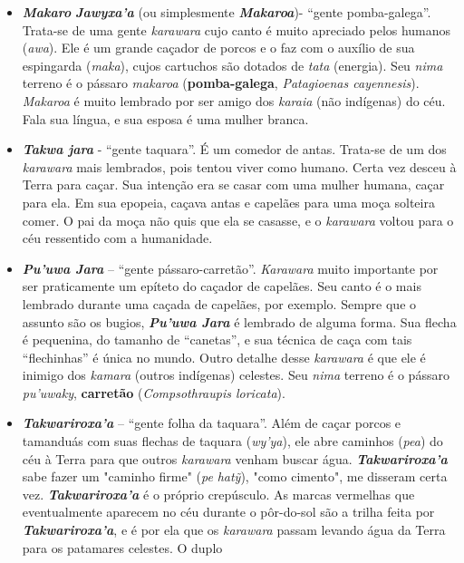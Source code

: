\begin{itemize}
\item
  \emph{\textbf{Makaro}} \emph{\textbf{Jawyxa'a}} (ou simplesmente
  \emph{\textbf{Makaroa}})- ``gente pomba-galega''. Trata-se de uma
  gente \emph{karawara} cujo canto é muito apreciado pelos humanos
  (\emph{awa}). Ele é um grande caçador de porcos e o faz com o auxílio
  de sua espingarda (\emph{maka}), cujos cartuchos são dotados de
  \emph{tata} (energia). Seu \emph{nima} terreno é o pássaro
  \emph{makaroa} (\textbf{pomba-galega}, \emph{Patagioenas cayennesis}).
  \emph{Makaroa} é muito lembrado por ser amigo dos \emph{karaia} (não
  indígenas) do céu. Fala sua língua, e sua esposa é uma mulher branca.
\item
  \emph{\textbf{Takwa jara}} - ``gente taquara''. É um comedor de antas.
  Trata-se de um dos \emph{karawara} mais lembrados, pois tentou viver
  como humano. Certa vez desceu à Terra para caçar. Sua intenção era se
  casar com uma mulher humana, caçar para ela. Em sua epopeia, caçava
  antas e capelães para uma moça solteira comer. O pai da moça não quis
  que ela se casasse, e o \emph{karawara} voltou para o céu ressentido
  com a humanidade.
\item
  \emph{\textbf{Pu'uwa Jara}} -- ``gente pássaro-carretão''.
  \emph{Karawara} muito importante por ser praticamente um epíteto do
  caçador de capelães. Seu canto é o mais lembrado durante uma caçada de
  capelães, por exemplo. Sempre que o assunto são os bugios,
  \textbf{\emph{Pu'uwa Jara}} é lembrado de alguma forma. Sua flecha é
  pequenina, do tamanho de ``canetas'', e sua técnica de caça com tais
  ``flechinhas'' é única no mundo. Outro detalhe desse \emph{karawara} é
  que ele é inimigo dos \emph{kamara} (outros indígenas) celestes. Seu
  \emph{nima} terreno é o pássaro \emph{pu'uwaky}, \textbf{carretão}
  (\emph{Compsothraupis loricata}).
\item
  \emph{\textbf{Takwariroxa'a}} -- ``gente folha da taquara''. Além de
  caçar porcos e tamanduás com suas flechas de taquara (\emph{wy'ya}),
  ele abre caminhos (\emph{pea}) do céu à Terra para que outros
  \emph{karawara} venham buscar água. \emph{\textbf{Takwariroxa'a}} sabe
  fazer um "caminho firme" (\emph{pe} \emph{hatỹ}), "como cimento", me
  disseram certa vez. \emph{\textbf{Takwariroxa'a}} é o próprio
  crepúsculo. As marcas vermelhas que eventualmente aparecem no céu
  durante o pôr-do-sol são a trilha feita por
  \emph{\textbf{Takwariroxa'a}}, e é por ela que os \emph{karawara}
  passam levando água da Terra para os patamares celestes. O duplo

\end{itemize}
